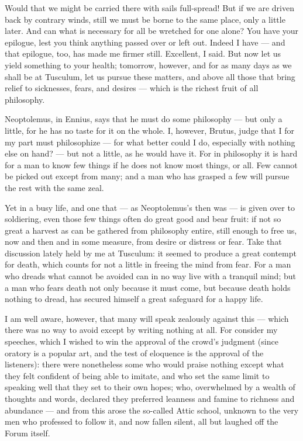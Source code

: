  Would that we might be carried there with sails full-spread! But if we are driven back by contrary winds, still we must be borne to the same place, only a little later. And can what is necessary for all be wretched for one alone? You have your epilogue, lest you think anything passed over or left out. Indeed I have — and that epilogue, too, has made me firmer still. Excellent, I said. But now let us yield something to your health; tomorrow, however, and for as many days as we shall be at Tusculum, let us pursue these matters, and above all those that bring relief to sicknesses, fears, and desires — which is the richest fruit of all philosophy.


 Neoptolemus, in Ennius, says that he must do some philosophy — but only a little, for he has no taste for it on the whole. I, however, Brutus, judge that I for my part must philosophize — for what better could I do, especially with nothing else on hand? — but not a little, as he would have it. For in philosophy it is hard for a man to know few things if he does not know most things, or all. Few cannot be picked out except from many; and a man who has grasped a few will pursue the rest with the same zeal.

 Yet in a busy life, and one that — as Neoptolemus's then was — is given over to soldiering, even those few things often do great good and bear fruit: if not so great a harvest as can be gathered from philosophy entire, still enough to free us, now and then and in some measure, from desire or distress or fear. Take that discussion lately held by me at Tusculum: it seemed to produce a great contempt for death, which counts for not a little in freeing the mind from fear. For a man who dreads what cannot be avoided can in no way live with a tranquil mind; but a man who fears death not only because it must come, but because death holds nothing to dread, has secured himself a great safeguard for a happy life.

 I am well aware, however, that many will speak zealously against this — which there was no way to avoid except by writing nothing at all. For consider my speeches, which I wished to win the approval of the crowd's judgment (since oratory is a popular art, and the test of eloquence is the approval of the listeners): there were nonetheless some who would praise nothing except what they felt confident of being able to imitate, and who set the same limit to speaking well that they set to their own hopes; who, overwhelmed by a wealth of thoughts and words, declared they preferred leanness and famine to richness and abundance — and from this arose the so-called Attic school, unknown to the very men who professed to follow it, and now fallen silent, all but laughed off the Forum itself.

